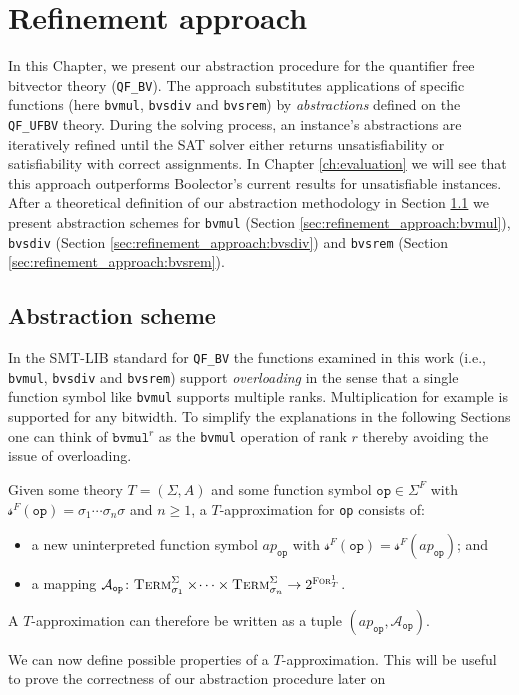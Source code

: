\chapter{Refinement approach}
\label{ch:refinement}
In this Chapter, we present our abstraction procedure for the quantifier free bitvector theory (\texttt{QF\_BV}).
The approach substitutes applications of specific functions (here \texttt{bvmul}, \texttt{bvsdiv} and \texttt{bvsrem}) by \textit{abstractions} defined on the \texttt{QF\_UFBV} theory.
During the solving process, an instance's abstractions are iteratively refined until the SAT solver either returns unsatisfiability or satisfiability with correct assignments.
In Chapter \ref{ch:evaluation} we will see that this approach outperforms Boolector's current results for unsatisfiable instances.
After a theoretical definition of our abstraction methodology in Section \ref{sec:refinement_approach:abstraction_scheme} we present abstraction schemes for \texttt{bvmul} (Section \ref{sec:refinement_approach:bvmul}), \texttt{bvsdiv} (Section \ref{sec:refinement_approach:bvsdiv}) and \texttt{bvsrem} (Section \ref{sec:refinement_approach:bvsrem}).

\section{Abstraction scheme}
\label{sec:refinement_approach:abstraction_scheme}
In the SMT-LIB standard \cite{BarFT-SMTLIB} for \texttt{QF\_BV} the functions examined in this work (i.e., \texttt{bvmul}, \texttt{bvsdiv} and \texttt{bvsrem}) support \textit{overloading} in the sense that a single function symbol like \texttt{bvmul} supports multiple ranks. Multiplication for example is supported for any bitwidth.
To simplify the explanations in the following Sections one can think of $\texttt{bvmul}^r$ as the \texttt{bvmul} operation of rank $r$ thereby avoiding the issue of overloading.

\begin{definition}[Approximation]
Given some theory $T=\left(\Sigma,A\right)$ and some function symbol $\texttt{op}\in\Sigma^F$ with $\mathcal{s}^F\left(\texttt{op}\right)=\sigma_1\dotsi\sigma_n\sigma$ and $n\geq1$, a $T$-approximation for \texttt{op} consists of:
\begin{itemize}
    \item a new uninterpreted function symbol $ap_{\texttt{op}}$ with $\mathcal{s}^F\left(\texttt{op}\right) = \mathcal{s}^F\left(ap_{\texttt{op}}\right)$; and
    \item a mapping $\mathcal{A}_{\texttt{op}}\colon \textsc{Term}^\Sigma_{\sigma_1}\times\dotsi\times\textsc{Term}^\Sigma_{\sigma_n} \to 2^{\textsc{For}^1_T}$.
\end{itemize}
A $T$-approximation can therefore be written as a tuple $\left(ap_{\texttt{op}}, \mathcal{A}_{\texttt{op}}\right)$.
\end{definition}
We can now define possible properties of a $T$-approximation. This will be useful to prove the correctness of our abstraction procedure later on

